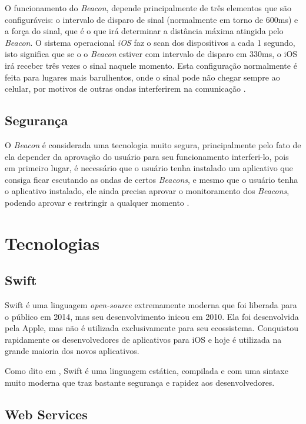 \documentclass[
	12pt,
	oneside,
	a4paper,
	english,
	brazil,
]{abntex2}
\begin{document}
O funcionamento do \emph{Beacon}, depende principalmente de três elementos que são configuráveis: o intervalo de disparo de sinal (normalmente em torno de 600ms) e a força do sinal, que é o que irá determinar a distância máxima atingida pelo \emph{Beacon}. O sistema operacional \emph{iOS} faz o scan dos dispositivos a cada 1 segundo, isto significa que se o o \emph{Beacon} estiver com intervalo de disparo em 330ms, o iOS irá receber três vezes o sinal naquele momento. Esta configuração normalmente é feita para lugares mais barulhentos, onde o sinal pode não chegar sempre ao celular, por motivos de outras ondas interferirem na comunicação \cite{beacon-how-it-works-estimote}.

\subsection{Segurança}

O \emph{Beacon} é considerada uma tecnologia muito segura, principalmente pelo fato de ela depender da aprovação do usuário para seu funcionamento interferi-lo, pois em primeiro lugar, é necessário que o usuário tenha instalado um aplicativo que consiga ficar escutando as ondas de certos \emph{Beacons}, e mesmo que o usuário tenha o aplicativo instalado, ele ainda precisa aprovar o monitoramento dos \emph{Beacons}, podendo aprovar e restringir a qualquer momento \cite{beacon-what-is-it-forbes}.

\section{Tecnologias}

\subsection{Swift}

Swift é uma linguagem \emph{open-source} extremamente moderna que foi liberada para o público em 2014, mas seu desenvolvimento inicou em 2010. Ela foi desenvolvida pela Apple, mas não é utilizada exclusivamente para seu ecossistema. Conquistou rapidamente os desenvolvedores de aplicativos para iOS e hoje é utilizada na grande maioria dos novos aplicativos.

Como dito em \cite{swift-about}, Swift é uma linguagem estática, compilada e com uma sintaxe muito moderna que traz bastante segurança e rapidez aos desenvolvedores.

\subsection{Web Services}
\end{document}
